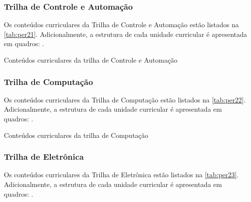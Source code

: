 \subsubsection{Trilha de Controle e Automação}

Os conteúdos curriculares da Trilha de Controle e Automação estão listados na \autoref{tab:per21}. Adicionalmente, a estrutura de cada unidade curricular é apresentada em quadros: .

\begin{table}[!htb]
	\centering\footnotesize
	\caption{Conteúdos curriculares da trilha de Controle e Automação}
	\label{tab:per21}
\end{table}

\clearpage

\subsubsection{Trilha de Computação}
\label{subsec:comp}

Os conteúdos curriculares da Trilha de Computação estão listados na \autoref{tab:per22}. Adicionalmente, a estrutura de cada unidade curricular é apresentada em quadros: .

\begin{table}[!htb]
	\centering\footnotesize
	\caption{Conteúdos curriculares da trilha de Computação}
	\label{tab:per22}
\end{table}

\clearpage

\subsubsection{Trilha de Eletrônica}

Os conteúdos curriculares da Trilha de Eletrônica estão listados na \autoref{tab:per23}. Adicionalmente, a estrutura de cada unidade curricular é apresentada em quadros: .

